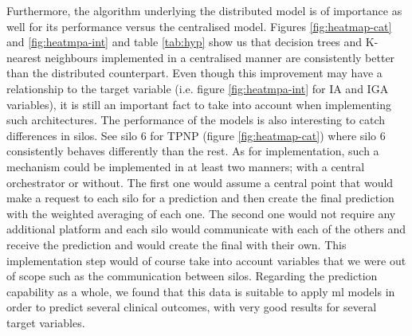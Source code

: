 Furthermore, the algorithm underlying the distributed model is of importance as well for its performance versus the centralised model. Figures \ref{fig:heatmap-cat} and \ref{fig:heatmpa-int} and table \ref{tab:hyp} show us that decision trees and K-nearest neighbours implemented in a centralised manner are consistently better than the distributed counterpart. Even though this improvement may have a relationship to the target variable (i.e. figure \ref{fig:heatmpa-int} for IA and IGA variables), it is still an important fact to take into account when implementing such architectures. The performance of the models is also interesting to catch differences in silos. See silo 6 for TPNP (figure \ref{fig:heatmap-cat}) where silo 6 consistently behaves differently than the rest.
As for implementation, such a mechanism could be implemented in at least two manners; with a central orchestrator or without. The first one would assume a central point that would make a request to each silo for a prediction and then create the final prediction with the weighted averaging of each one. The second one would not require any additional platform and each silo would communicate with each of the others and receive the prediction and would create the final with their own. This implementation step would of course take into account variables that we were out of scope such as the communication between silos. 
Regarding the prediction capability as a whole, we found that this data is suitable to apply \ac{ml} models in order to predict several clinical outcomes, with very good results for several target variables. 

